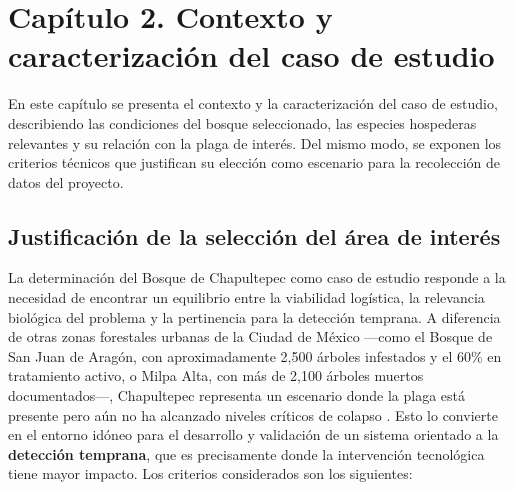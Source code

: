 \newpage
\section*{Capítulo 2. Contexto y caracterización del caso de estudio}
\setcounter{section}{2}
\setcounter{subsection}{0}

En este capítulo se presenta el contexto y la caracterización del caso de estudio, describiendo las condiciones del bosque seleccionado, las especies hospederas relevantes y su relación con la plaga de interés. Del mismo modo, se exponen los criterios técnicos que justifican su elección como escenario para la recolección de datos del proyecto.

\subsection{Justificación de la selección del área de interés}
La determinación del Bosque de Chapultepec como caso de estudio responde a la necesidad de encontrar un equilibrio entre la viabilidad logística, la relevancia biológica del problema y la pertinencia para la detección temprana. A diferencia de otras zonas forestales urbanas de la Ciudad de México —como el Bosque de San Juan de Aragón, con aproximadamente 2,500 árboles infestados y el 60\% en tratamiento activo, o Milpa Alta, con más de 2,100 árboles muertos documentados—, Chapultepec representa un escenario donde la plaga está presente pero aún no ha alcanzado niveles críticos de colapso \cite{mora2022chapultepec}. Esto lo convierte en el entorno idóneo para el desarrollo y validación de un sistema orientado a la \textbf{detección temprana}, que es precisamente donde la intervención tecnológica tiene mayor impacto. Los criterios considerados son los siguientes:

